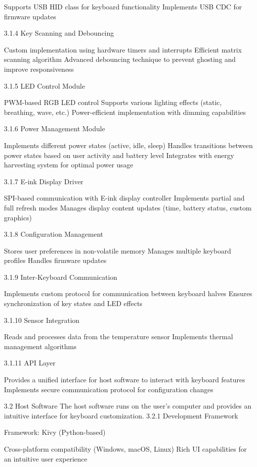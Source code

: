 \documentclass[a4paper,11pt]{article}%
\begin{document}
Supports USB HID class for keyboard functionality
Implements USB CDC for firmware updates



3.1.4 Key Scanning and Debouncing

Custom implementation using hardware timers and interrupts
Efficient matrix scanning algorithm
Advanced debouncing technique to prevent ghosting and improve responsiveness

3.1.5 LED Control Module

PWM-based RGB LED control
Supports various lighting effects (static, breathing, wave, etc.)
Power-efficient implementation with dimming capabilities

3.1.6 Power Management Module

Implements different power states (active, idle, sleep)
Handles transitions between power states based on user activity and battery level
Integrates with energy harvesting system for optimal power usage

3.1.7 E-ink Display Driver

SPI-based communication with E-ink display controller
Implements partial and full refresh modes
Manages display content updates (time, battery status, custom graphics)

3.1.8 Configuration Management

Stores user preferences in non-volatile memory
Manages multiple keyboard profiles
Handles firmware updates

3.1.9 Inter-Keyboard Communication

Implements custom protocol for communication between keyboard halves
Ensures synchronization of key states and LED effects

3.1.10 Sensor Integration

Reads and processes data from the temperature sensor
Implements thermal management algorithms

3.1.11 API Layer

Provides a unified interface for host software to interact with keyboard features
Implements secure communication protocol for configuration changes

3.2 Host Software
The host software runs on the user's computer and provides an intuitive interface for keyboard customization.
3.2.1 Development Framework

Framework: Kivy (Python-based)

Cross-platform compatibility (Windows, macOS, Linux)
Rich UI capabilities for an intuitive user experience
\end{document}
